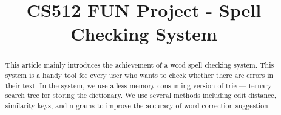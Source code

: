 \documentclass[10pt,conference]{IEEEtran}
\begin{document}
\title{CS512 FUN Project - Spell Checking System}
\author{
\and
{}
\and
{}
}

\maketitle
\begin{abstract}
\textnormal{
This article mainly introduces the achievement of a word spell checking system. This system is a handy tool for every user who wants to check whether there are errors in their text. In the system, we use a less memory-consuming version of trie --- ternary search tree for storing the dictionary. We use several methods including edit distance,  similarity keys, and n-grams to improve the accuracy of word correction suggestion. 
}
\end{abstract}

\IEEEpeerreviewmaketitle
\end{document}
